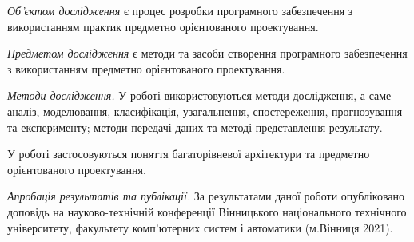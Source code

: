 \emph{Об'єктом дослідження} є процес розробки програмного забезпечення
з використанням практик предметно орієнтованого проектування.

\emph{Предметом дослідження} є методи та засоби створення програмного
забезпечення з використанням предметно орієнтованого проектування.

\emph{Методи дослідження.} У роботі використовуються методи дослідження, а
саме аналіз, моделювання, класифікація, узагальнення, спостереження,
прогнозування та експерименту; методи передачі даних та методі
представлення результату.

У роботі застосовуються поняття багаторівневої архітектури та
предметно орієнтованого проектування.

\emph{Апробація результатів та публікації.} За результатами даної роботи
опубліковано доповідь \cite{thesis} на науково-технічній конференції
Вінницького національного технічного університету,
факультету комп'ютерних систем і автоматики (м.Вінниця 2021).

\clearpage
